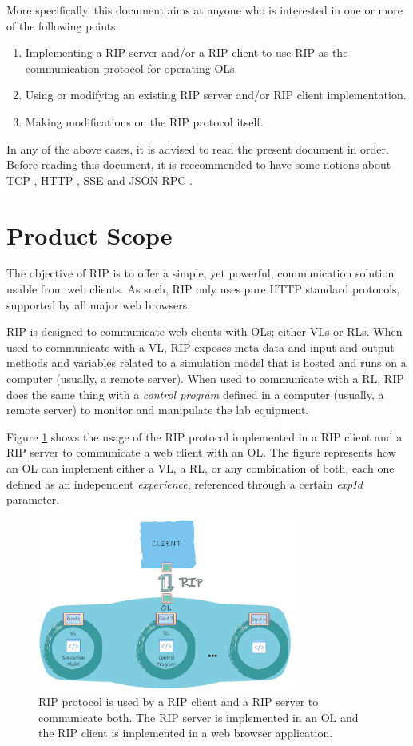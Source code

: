 More specifically, this document aims at anyone who is interested in one or more of the following points:

\begin{enumerate}
    \item Implementing a RIP server and/or a RIP client to use RIP as the communication protocol for operating OLs.
    \item Using or modifying an existing RIP server and/or RIP client implementation.
    \item Making modifications on the RIP protocol itself.
\end{enumerate}

In any of the above cases, it is advised to read the present document in order. Before reading this document, it is reccommended to have some notions about TCP \cite{tcp}, HTTP \cite{http}, SSE \cite{sse} and JSON-RPC \cite{jsonrpc}.

\section{Product Scope}
The objective of RIP is to offer a simple, yet powerful, communication solution usable from web clients. As such, RIP only uses pure HTTP standard protocols, supported by all major web browsers.

RIP is designed to communicate web clients with OLs; either VLs or RLs. When used to communicate with a VL, RIP exposes meta-data and input and output methods and variables related to a simulation model that is hosted and runs on a computer (usually, a remote server). When used to communicate with a RL, RIP does the same thing with a \textit{control program} defined in a computer (usually, a remote server) to monitor and manipulate the lab equipment.

Figure \ref{fig:Client-RIP-OL} shows the usage of the RIP protocol implemented in a RIP client and a RIP server to communicate a web client with an OL. The figure represents how an OL can implement either a VL, a RL, or any combination of both, each one defined as an independent \textit{experience}, referenced through a certain \textit{expId} parameter.

\begin{figure}[hb!]
\centering
\includegraphics[width=0.75\textwidth]{images/Client-RIP-OL.pdf}
\caption{RIP protocol is used by a RIP client and a RIP server to communicate both. The RIP server is implemented in an OL and the RIP client is implemented in a web browser application.}
\label{fig:Client-RIP-OL}
\end{figure}


